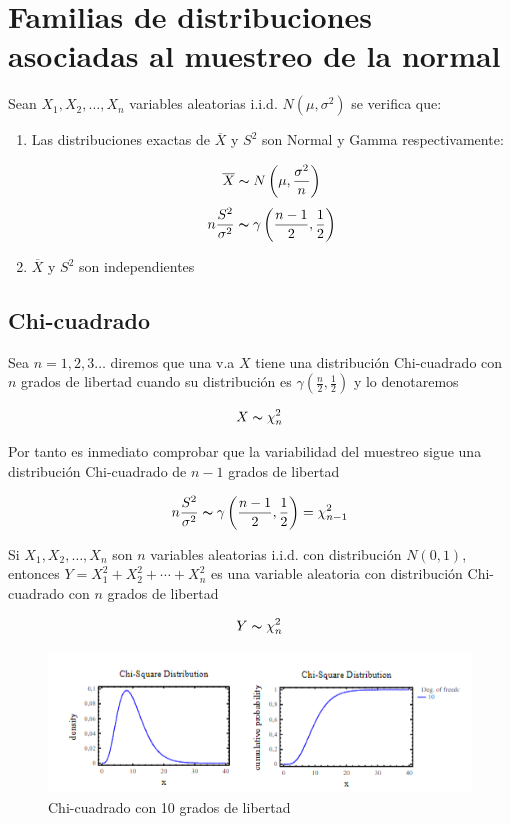 \section{Familias de distribuciones asociadas al muestreo de la normal}


Sean $X_1, X_2, \dots, X_n$ variables aleatorias i.i.d. $N(\mu, \sigma^2)$ se verifica que:

\begin{enumerate}
    \item Las distribuciones exactas de $\overline{X}$ y $S^2$ son Normal y Gamma respectivamente:

          \[
              \overline{X} \thicksim N\left(\mu,\frac{\sigma^2}{n}\right)
          \]
          \[
              n \frac{S^2}{\sigma^2} \thicksim \gamma\left( \frac{n-1}{2}, \frac{1}{2}\right)
          \]

    \item $\overline{X}$ y $S^2$ son independientes
\end{enumerate}

\subsection{Chi-cuadrado}

Sea $n = 1, 2, 3 \dots$ diremos que una v.a $X$ tiene una distribución Chi-cuadrado con $n$ grados de libertad
cuando su distribución es $\gamma\left(\frac{n}{2}, \frac{1}{2}\right)$ y lo denotaremos

\[
    X \thicksim \chi^2_n
\]

Por tanto es inmediato comprobar que la variabilidad del muestreo sigue una distribución Chi-cuadrado de $n - 1$
grados de libertad

\[
    n\frac{S^2}{\sigma^2} \thicksim \gamma\left(\frac{n - 1}{2}, \frac{1}{2}\right) = \chi^2_{n - 1}
\]

Si $X_1, X_2, \dots, X_n$ son $n$ variables aleatorias i.i.d. con distribución $N(0,1)$, entonces
$Y = X_1^2 + X_2^2 + \dotsi + X_n^2$ es una variable aleatoria con distribución Chi-cuadrado con $n$
grados de libertad

\[
    Y \thicksim \chi^2_n
\]

\newpage

\begin{figure}[h!]
    \begin{center}
        \includegraphics{img/Chi10.png}
    \end{center}
    \caption{Chi-cuadrado con 10 grados de libertad}
\end{figure}

